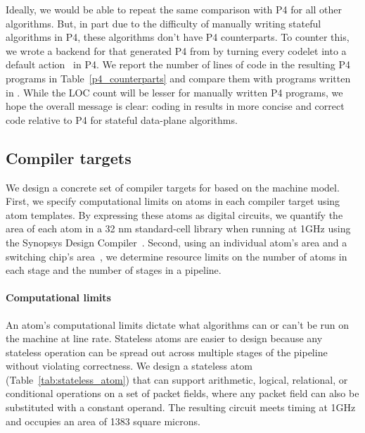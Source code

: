 Ideally, we would be able to repeat the same comparison with P4 for all other
algorithms. But, in part due to the difficulty of manually writing stateful
algorithms in P4, these algorithms don't have P4 counterparts. To counter this,
we wrote a backend for \pktlanguage that generated P4 from \pktlanguage by
turning every codelet into a default action~\cite{p4spec} in P4.  We report the
number of lines of code in the resulting P4 programs in
Table~\ref{p4_counterparts} and compare them with programs written in
\pktlanguage. While the LOC count will be lesser for manually written P4
programs, we hope the overall message is clear: coding in \pktlanguage results
in more concise and correct code relative to P4 for stateful data-plane algorithms.


\subsection{Compiler targets}

We design a concrete set of compiler targets for \pktlanguage based on the
\absmachine machine model. First, we specify computational limits on atoms in
each compiler target using atom templates. By expressing these atoms as digital
circuits, we quantify the area of each atom in a 32 nm standard-cell library
when running at 1GHz using the Synopsys Design Compiler~\cite{synopsys_dc}.
Second, using an individual atom's area and a switching chip's
area~\cite{gibb_parsing}, we determine resource limits on the number of atoms
in each stage and the number of stages in a pipeline.

\paragraph{Computational limits}
An atom's computational limits dictate what algorithms can or can't be run on
the \absmachine machine at line rate. Stateless atoms are easier to design
because any stateless operation can be spread out across multiple stages of the
pipeline without violating correctness. We design a stateless atom
(Table~\ref{tab:stateless_atom}) that can support arithmetic, logical,
relational, or conditional operations on a set of packet fields, where any
packet field can also be substituted with a constant operand. The resulting
circuit meets timing at 1GHz and occupies an area of 1383 square microns.

